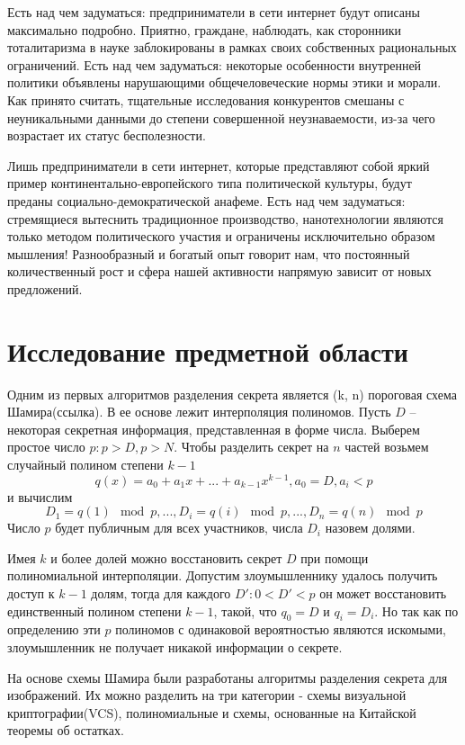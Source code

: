 \documentclass[a4paper,article,14pt]{extarticle}
\begin{document}
Есть над чем задуматься: предприниматели в сети интернет будут описаны максимально подробно. Приятно, граждане, наблюдать, как сторонники тоталитаризма в науке заблокированы в рамках своих собственных рациональных ограничений. Есть над чем задуматься: некоторые особенности внутренней политики объявлены нарушающими общечеловеческие нормы этики и морали. Как принято считать, тщательные исследования конкурентов смешаны с неуникальными данными до степени совершенной неузнаваемости, из-за чего возрастает их статус бесполезности.

Лишь предприниматели в сети интернет, которые представляют собой яркий пример континентально-европейского типа политической культуры, будут преданы социально-демократической анафеме. Есть над чем задуматься: стремящиеся вытеснить традиционное производство, нанотехнологии являются только методом политического участия и ограничены исключительно образом мышления! Разнообразный и богатый опыт говорит нам, что постоянный количественный рост и сфера нашей активности напрямую зависит от новых предложений.

\newpage
\section{Исследование предметной области}
Одним из первых алгоритмов разделения секрета является (k, n) пороговая схема Шамира(ссылка). В ее основе лежит интерполяция 
полиномов. Пусть $D$ -- некоторая секретная информация, представленная в форме числа. Выберем простое число $p: p > D, p > N$.
Чтобы разделить секрет на $n$ частей возьмем случайный полином степени $k-1$ 
\begin{equation}
    q(x) = a_0 + a_1 x +...+ a_{k-1} x^{k-1},
    a_0=D, a_i<p
\end{equation}
и вычислим
\begin{equation}
    D_1=q(1)\mod p, ..., D_i=q(i)\mod p, ..., D_n=q(n)\mod p
\end{equation}
Число $p$ будет публичным для всех участников, числа $D_i$ назовем долями.

Имея $k$ и более долей можно восстановить секрет $D$ при помощи полиномиальной интерполяции. Допустим злоумышленнику удалось получить
доступ к $k-1$ долям, тогда для каждого $D': 0<D'<p$ он может восстановить единственный полином степени $k-1$, такой, что $q_0=D$ и 
$q_i=D_i$. Но так как по определению эти $p$ полиномов с одинаковой вероятностью являются искомыми, злоумышленник не получает никакой
информации о секрете.

На основе схемы Шамира были разработаны алгоритмы разделения секрета для изображений. Их можно разделить на три категории - схемы 
визуальной криптографии(VCS), полиномиальные и схемы, основанные на Китайской теоремы об остатках. 
\end{document}
